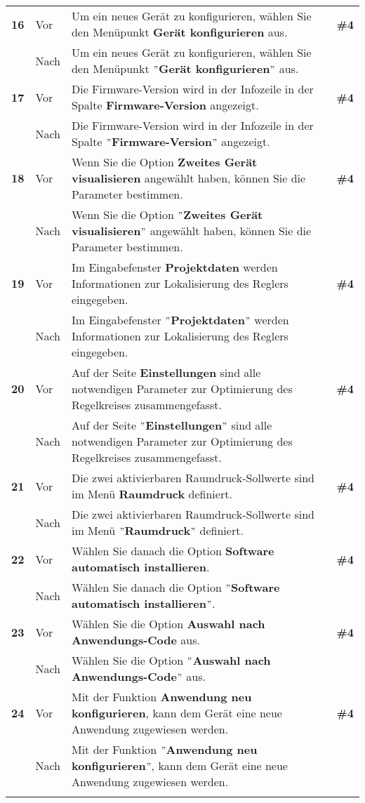 \begin{longtable}{llp{}l}
\tablevspace
{ \textbf{16}} & Vor & Um ein neues Gerät zu konfigurieren, wählen Sie den Menüpunkt \textbf{Gerät konfigurieren} aus. & \textbf{\#4}\\
& Nach & Um ein neues Gerät zu konfigurieren, wählen Sie den Menüpunkt \textbf{$"$Gerät konfigurieren$"$} aus. & \\
\tablevspace
{ \textbf{17}} & Vor & Die Firmware-Version wird in der Infozeile in der Spalte \textbf{Firmware-Version} angezeigt. & \textbf{\#4}\\
& Nach & Die Firmware-Version wird in der Infozeile in der Spalte \textbf{$"$Firmware-Version$"$} angezeigt. & \\
\tablevspace
{ \textbf{18}} & Vor & Wenn Sie die Option \textbf{Zweites Gerät visualisieren} angewählt haben, können Sie die Parameter bestimmen. & \textbf{\#4}\\
& Nach & Wenn Sie die Option \textbf{$"$Zweites Gerät visualisieren$"$} angewählt haben, können Sie die Parameter bestimmen. & \\
\tablevspace
{ \textbf{19}} & Vor & Im Eingabefenster \textbf{Projektdaten} werden Informationen zur Lokalisierung des Reglers eingegeben. & \textbf{\#4}\\
& Nach & Im Eingabefenster \textbf{$"$Projektdaten$"$} werden Informationen zur Lokalisierung des Reglers eingegeben. & \\
\tablevspace
{ \textbf{20}} & Vor & Auf der Seite \textbf{Einstellungen} sind alle notwendigen Parameter zur Optimierung des Regelkreises zusammengefasst. & \textbf{\#4}\\
& Nach & Auf der Seite \textbf{$"$Einstellungen$"$} sind alle notwendigen Parameter zur Optimierung des Regelkreises zusammengefasst. & \\
\tablevspace
{ \textbf{21}} & Vor & Die zwei aktivierbaren Raumdruck-Sollwerte sind im Menü \textbf{Raumdruck} definiert. & \textbf{\#4}\\
& Nach & Die zwei aktivierbaren Raumdruck-Sollwerte sind im Menü \textbf{$"$Raumdruck$"$} definiert. & \\
\tablevspace
{ \textbf{22}} & Vor & Wählen Sie danach die Option \textbf{Software automatisch installieren}. & \textbf{\#4}\\
& Nach & Wählen Sie danach die Option \textbf{$"$Software automatisch installieren$"$}. & \\
\tablevspace
{ \textbf{23}} & Vor & Wählen Sie die Option \textbf{Auswahl nach Anwendungs-Code} aus. & \textbf{\#4}\\
& Nach & Wählen Sie die Option \textbf{$"$Auswahl nach Anwendungs-Code$"$} aus. & \\
\tablevspace
{ \textbf{24}} & Vor & Mit der Funktion \textbf{Anwendung neu konfigurieren}, kann dem Gerät eine neue Anwendung zugewiesen werden. & \textbf{\#4}\\
& Nach & Mit der Funktion \textbf{$"$Anwendung neu konfigurieren$"$}, kann dem Gerät eine neue Anwendung zugewiesen werden. & \\
\lspbottomrule
\end{longtable}


